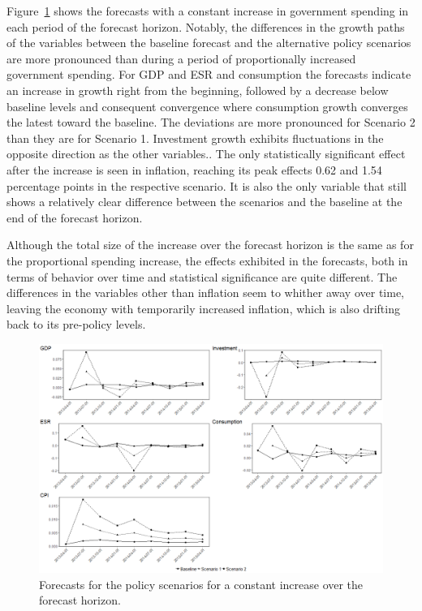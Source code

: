 Figure~\ref{fig:results_dvarL} shows the forecasts with a constant increase in government spending in each period of the forecast horizon. Notably, the differences in the growth paths of the variables between the baseline forecast and the alternative policy scenarios are more pronounced than during a period of proportionally increased government spending. For GDP and ESR and consumption the forecasts indicate an increase in growth right from the beginning, followed by a decrease below baseline levels and consequent convergence where consumption growth converges the latest toward the baseline. The deviations are more pronounced for Scenario 2 than they are for Scenario 1. Investment growth exhibits fluctuations in the opposite direction as the other variables.. The only statistically significant effect after the increase is seen in inflation, reaching its peak effects 0.62 and 1.54 percentage points in the respective scenario. It is also the only variable that still shows a relatively clear difference between the scenarios and the baseline at the end of the forecast horizon.

Although the total size of the increase over the forecast horizon is the same as for the proportional spending increase, the effects exhibited in the forecasts, both in terms of behavior over time and statistical significance are quite different. The differences in the variables other than inflation seem to whither away over time, leaving the economy with temporarily increased inflation, which is also drifting back to its pre-policy levels. 

\begin{figure}[!htbp]
	\centering
	\includegraphics[width=1\textwidth,height=1\textheight,keepaspectratio]{scenariofcst_linear.png}
	\caption{Forecasts for the policy scenarios for a constant increase over the forecast horizon.}
	\label{fig:results_dvarL}
\end{figure} 

